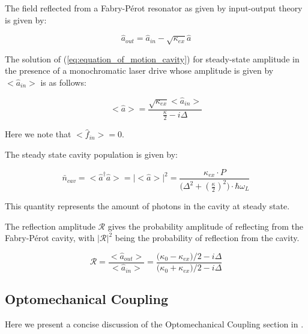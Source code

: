 \documentclass[%
 reprint,
nofootinbib,
 amsmath,amssymb,
 aps,
]{revtex4-2}
\begin{document}
The field reflected from a Fabry-P\'{e}rot resonator as given by input-output theory is given by:

\begin{equation*}
    \hat{a}_{out} = \hat{a}_{in} - \sqrt{\kappa_{ex}} \hat{a}
\end{equation*}

The solution of (\ref{eq:equation_of_motion_cavity}) for steady-state amplitude in the presence of a monochromatic laser drive whose amplitude is given by $\big < \hat{a}_{in} \big >$ is as follows:

\begin{equation*}
    \big < \hat{a} \big > = \frac{\sqrt{\kappa_{ex}}\big < \hat{a}_{in} \big >}{\frac{\kappa}{2} - i\Delta}
\end{equation*}

Here we note that $\big< \hat{f}_{in} \big > = 0$.
\newline

The steady state cavity population is given by:

\begin{equation*}
    \bar{n}_{cav} = \big < \hat{a}^{\dagger} \hat{a} \big > = \big | \big < \hat{a} \big > \big | ^{2} = \frac{\kappa_{ex}\cdot P}{\big ( \Delta^{2} + (\frac{\kappa}{2})^{2} \big ) \cdot \hbar \omega_{L}}
\end{equation*}

This quantity represents the amount of photons in the cavity at steady state. 
\newline

The reflection amplitude $\mathcal{R}$ gives the probability amplitude of reflecting from the Fabry-P\'{e}rot cavity, with $\big | \mathcal{R} \big |^{2}$ being the probability of reflection from the cavity.

\begin{equation*}
    \mathcal{R} = \frac{\big< \hat{a}_{out} \big>}{\big< \hat{a}_{in} \big>} = \frac{\big( \kappa_{0} - \kappa_{ex} \big)/2 - i\Delta}{\big( \kappa_{0} + \kappa_{ex} \big)/2 - i\Delta}
\end{equation*}

\subsection{Optomechanical Coupling}
Here we present a concise discussion of the Optomechanical Coupling section in \cite{cavity_optomechanics_2014}.
\newline
\end{document}
